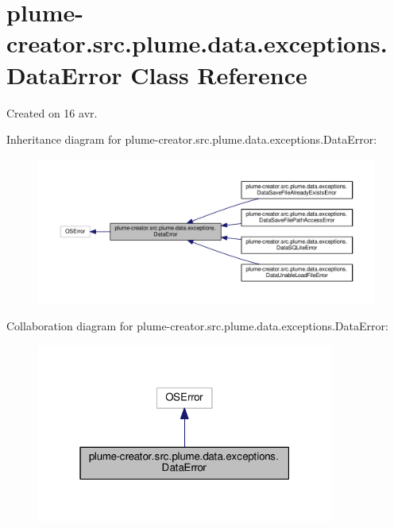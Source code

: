 \hypertarget{classplume-creator_1_1src_1_1plume_1_1data_1_1exceptions_1_1_data_error}{}\section{plume-\/creator.src.\+plume.\+data.\+exceptions.\+Data\+Error Class Reference}
\label{classplume-creator_1_1src_1_1plume_1_1data_1_1exceptions_1_1_data_error}


Created on 16 avr.  




Inheritance diagram for plume-\/creator.src.\+plume.\+data.\+exceptions.\+Data\+Error\+:
\nopagebreak
\begin{figure}[H]
\begin{center}
\leavevmode
\includegraphics[width=350pt]{classplume-creator_1_1src_1_1plume_1_1data_1_1exceptions_1_1_data_error__inherit__graph}
\end{center}
\end{figure}


Collaboration diagram for plume-\/creator.src.\+plume.\+data.\+exceptions.\+Data\+Error\+:\nopagebreak
\begin{figure}[H]
\begin{center}
\leavevmode
\includegraphics[width=277pt]{classplume-creator_1_1src_1_1plume_1_1data_1_1exceptions_1_1_data_error__coll__graph}
\end{center}
\end{figure}


